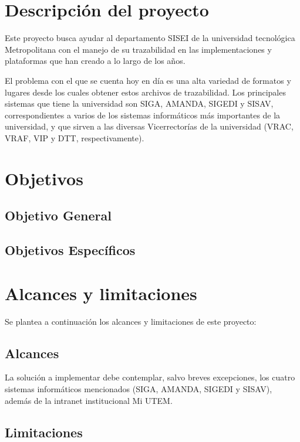 \section{Descripción del proyecto}

Este proyecto busca ayudar al departamento SISEI de la universidad tecnológica Metropolitana con el manejo de su trazabilidad en las implementaciones y plataformas que han creado a lo largo de los años.

El problema con el que se cuenta hoy en día es una alta variedad de formatos y lugares desde los cuales obtener estos archivos de trazabilidad. Los principales sistemas que tiene la universidad son SIGA, AMANDA, SIGEDI y SISAV, correspondientes a varios de los sistemas informáticos más importantes de la universidad, y que sirven a las diversas Vicerrectorías de la universidad (VRAC, VRAF, VIP y DTT, respectivamente).

\lipsum[2]

\section{Objetivos}
\subsection{Objetivo General}



\subsection{Objetivos Específicos}

\section{Alcances y limitaciones}

Se plantea a continuación los alcances y limitaciones de este proyecto:

\subsection{Alcances}

La solución a implementar debe contemplar, salvo breves excepciones, los cuatro sistemas informáticos mencionados (SIGA, AMANDA, SIGEDI y SISAV), además de la intranet institucional Mi UTEM.

\subsection{Limitaciones}
\lipsum[5]
